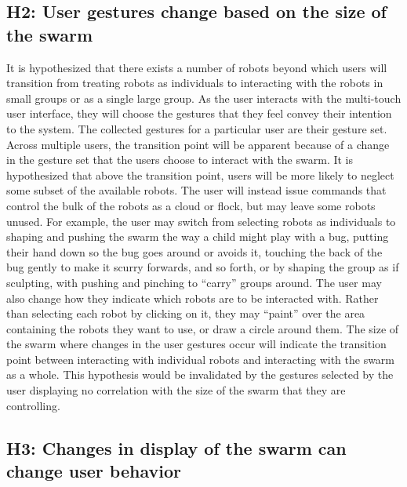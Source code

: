 \subsection{H2: User gestures change based on the size of the swarm}

It is hypothesized that there exists a number of robots beyond which users will transition from treating robots as individuals to interacting with the robots in small groups or as a single large group. 
As the user interacts with the multi-touch user interface, they will choose the gestures that they feel convey their intention to the system. 
The collected gestures for a particular user are their gesture set.
Across multiple users, the transition point will be apparent because of a change in the gesture set that the users choose to interact with the swarm. 
It is hypothesized that above the transition point, users will be more likely to neglect some subset of the available robots. 
The user will instead issue commands that control the bulk of the robots as a cloud or flock, but may leave some robots unused. 
For example, the user may switch from selecting robots as individuals to shaping and pushing the swarm the way a child might play with a bug, putting their hand down so the bug goes around or avoids it, touching the back of the bug gently to make it scurry forwards, and so forth, or by shaping the group as if sculpting, with pushing and pinching to ``carry'' groups around. 
The user may also change how they indicate which robots are to be interacted with. 
Rather than selecting each robot by clicking on it, they may ``paint'' over the area containing the robots they want to use, or draw a circle around them. 
The size of the swarm where changes in the user gestures occur will indicate the transition point between interacting with individual robots and interacting with the swarm as a whole. 
This hypothesis would be invalidated by the gestures selected by the user displaying no correlation with the size of the swarm that they are controlling. 


\subsection{H3: Changes in display of the swarm can change user behavior}

